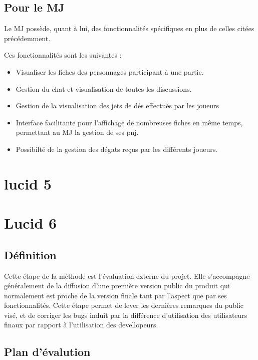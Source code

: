 \documentclass[11pt,a4paper]{report}
\begin{document}
\subsection{Pour le MJ}
Le MJ possède, quant à lui, des fonctionnalités spécifiques en plus de celles
citées précédemment.

Ces fonctionnalités sont les suivantes :

\begin{itemize}
  \item Visualiser les fiches des personnages participant à une partie.
  \item Gestion du chat et visualisation de toutes les discussions.
\item Gestion de la visualisation des jets de dés effectués par les joueurs
\item Interface facilitante pour l'affichage de nombreuses fiches en même temps,
permettant au MJ la gestion de ses pnj.
\item Possibilté de la gestion des dégats reçus par les différents joueurs.
\end{itemize}

\clearpage

\section{lucid 5}




\section{Lucid 6}

\subsection{Définition}

Cette étape de la méthode est l'évaluation externe du projet. Elle s'accompagne
généralement de la diffusion d'une première version public du produit qui
normalement est proche de la version finale tant par l'aspect que par ses
fonctionnalités.
Cette étape permet de lever les dernières remarques du public visé, et de
corriger les bugs induit par la différence d'utilisation des utilisateurs finaux
par rapport à l'utilisation des devellopeurs.


\subsection{Plan d'évalution}
\end{document}
